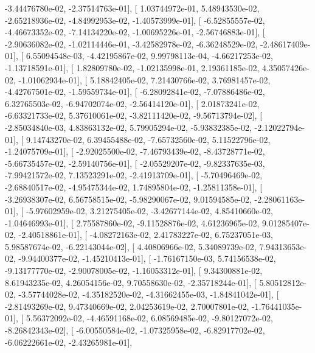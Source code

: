 \documentclass{article}
\begin{document}
         -3.44476780e-02,  -2.37514763e-01],
       [  1.03744972e-01,   5.48943530e-02,  -2.65218936e-02,
         -4.84992953e-02,  -1.40573999e-01],
       [ -6.52855557e-02,  -4.46673352e-02,  -7.14134220e-02,
         -1.00695226e-01,  -2.56746883e-01],
       [ -2.90636082e-02,  -1.02114446e-01,  -3.42582978e-02,
         -6.36248529e-02,  -2.48617409e-01],
       [  6.55094548e-03,  -4.42195867e-02,   9.99798113e-04,
         -4.66217253e-02,  -1.13718591e-01],
       [  1.82809780e-02,  -1.02135998e-01,   2.19361185e-02,
          4.35057426e-02,  -1.01062934e-01],
       [  5.18842405e-02,   7.21430766e-02,   3.76981457e-02,
         -4.42767501e-02,  -1.59559734e-01],
       [ -6.28092841e-02,  -7.07886486e-02,   6.32765503e-02,
         -6.94702074e-02,  -2.56414120e-01],
       [  2.01873241e-02,  -6.63321733e-02,   5.37610061e-02,
         -3.82111420e-02,  -9.56713794e-02],
       [ -2.85034840e-03,   4.83863132e-02,   5.79905294e-02,
         -5.93832385e-02,  -2.12022794e-01],
       [  9.14743270e-02,   6.39455488e-02,  -7.65732560e-02,
          5.11522796e-02,  -1.24075709e-01],
       [ -2.92025500e-02,  -7.46793439e-02,  -8.43728771e-02,
         -5.66735457e-02,  -2.59140756e-01],
       [ -2.05529207e-02,  -9.82337635e-03,  -7.99421572e-02,
          7.13523291e-02,  -2.41913709e-01],
       [ -5.70496469e-02,  -2.68840517e-02,  -4.95475344e-02,
          1.74895804e-02,  -1.25811358e-01],
       [ -3.26938307e-02,   6.56758515e-02,  -5.98290067e-02,
          9.01594585e-02,  -2.28061163e-01],
       [ -5.97602959e-02,   3.21275405e-02,  -3.42677144e-02,
          4.85410660e-02,  -1.04646993e-01],
       [  2.75587860e-02,  -9.11528876e-02,   4.61236965e-02,
          9.01285407e-02,  -2.40518861e-01],
       [ -4.08272163e-02,   2.41783227e-02,   6.75237051e-03,
          5.98587674e-02,  -6.22143044e-02],
       [  4.40806966e-02,   5.34089739e-02,   7.94313653e-02,
         -9.94400377e-02,  -1.45210413e-01],
       [ -1.76167150e-03,   5.74156538e-02,  -9.13177770e-02,
         -2.90078005e-02,  -1.16053312e-01],
       [  9.34300881e-02,   8.61943235e-02,   4.26054156e-02,
          9.70558630e-02,  -2.35718244e-01],
       [  5.80512812e-02,  -3.57744028e-02,  -4.35182520e-02,
         -4.31662455e-03,  -1.84841042e-01],
       [ -2.81493269e-02,   9.47340669e-02,   2.04253619e-02,
          2.70007801e-02,  -1.76441035e-01],
       [  5.56372092e-02,  -4.46591168e-02,   6.08569485e-02,
         -9.80127072e-02,  -8.26842343e-02],
       [ -6.00550584e-02,  -1.07325958e-02,  -6.82917702e-02,
         -6.06222661e-02,  -2.43265981e-01],
\end{document}
